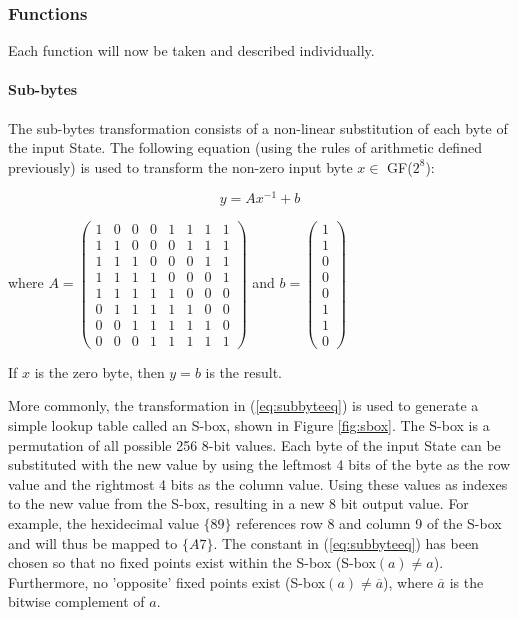 \documentclass[a4paper,10pt]{report}
\begin{document}
\subsubsection{Functions}

Each function will now be taken and described individually. 

\paragraph{Sub-bytes}

The sub-bytes transformation consists of a non-linear substitution of each byte of the input State. The following equation (using the rules of arithmetic defined previously) is used to transform the non-zero input byte $x \in$ GF($2^{8}$): 

\begin{equation}
 y = Ax^{-1} + b
\label{eq:subbyteeq}
\end{equation}

where
$
A = 
\begin{pmatrix}
  1 & 0 & 0 & 0 & 1 & 1 & 1 & 1 \\
  1 & 1 & 0 & 0 & 0 & 1 & 1 & 1 \\
  1 & 1 & 1 & 0 & 0 & 0 & 1 & 1 \\
  1 & 1 & 1 & 1 & 0 & 0 & 0 & 1 \\
  1 & 1 & 1 & 1 & 1 & 0 & 0 & 0 \\
  0 & 1 & 1 & 1 & 1 & 1 & 0 & 0 \\
  0 & 0 & 1 & 1 & 1 & 1 & 1 & 0 \\
  0 & 0 & 0 & 1 & 1 & 1 & 1 & 1
 \end{pmatrix}
$
and
$ 
b = 
 \begin{pmatrix}
   1 \\ 1 \\ 0 \\ 0 \\ 0 \\ 1 \\ 1 \\ 0 
 \end{pmatrix}
$

If $x$ is the zero byte, then $y = b$ is the result. 

More commonly, the transformation in (\ref{eq:subbyteeq}) is used to generate a simple lookup table called an S-box, shown in Figure \ref{fig:sbox}. The S-box is a permutation of all possible 256 8-bit values. Each byte of the input State can be substituted with the new value by using the leftmost 4 bits of the byte as the row value and the rightmost 4 bits as the column value. Using these values as indexes to the new value from the S-box, resulting in a new 8 bit output value. For example, the hexidecimal value $\{89\}$ references row 8 and column 9 of the S-box and will thus be mapped to $\{A7\}$. The constant in (\ref{eq:subbyteeq}) has been chosen so that no fixed points exist within the S-box (S-box$(a) \neq a $). Furthermore, no 'opposite' fixed points exist (S-box$(a) \neq \overline{a} $), where $\overline{a}$ is the bitwise complement of $a$. 
\end{document}

